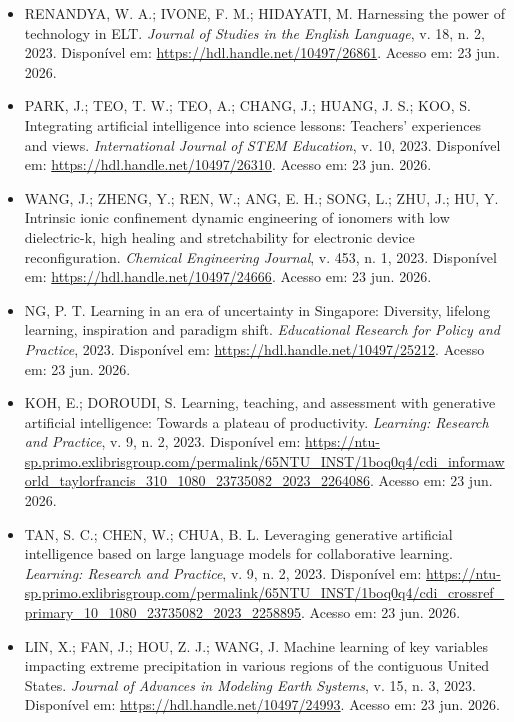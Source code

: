 \documentclass[english]{textolivre}
\begin{document}
\begin{itemize}
\item[] RENANDYA, W. A.; IVONE, F. M.; HIDAYATI, M. Harnessing the power of technology in ELT. \textit{Journal of Studies in the English Language}, v. 18, n. 2, 2023. Disponível em: \url{https://hdl.handle.net/10497/26861}. Acesso em: 23 jun. 2026.

\item[] PARK, J.; TEO, T. W.; TEO, A.; CHANG, J.; HUANG, J. S.; KOO, S. Integrating artificial intelligence into science lessons: Teachers’ experiences and views. \textit{International Journal of STEM Education}, v. 10, 2023. Disponível em: \url{https://hdl.handle.net/10497/26310}. Acesso em: 23 jun. 2026.

\item[] WANG, J.; ZHENG, Y.; REN, W.; ANG, E. H.; SONG, L.; ZHU, J.; HU, Y. Intrinsic ionic confinement dynamic engineering of ionomers with low dielectric-k, high healing and stretchability for electronic device reconfiguration. \textit{Chemical Engineering Journal}, v. 453, n. 1, 2023. Disponível em: \url{https://hdl.handle.net/10497/24666}. Acesso em: 23 jun. 2026.

\item[] NG, P. T. Learning in an era of uncertainty in Singapore: Diversity, lifelong learning, inspiration and paradigm shift. \textit{Educational Research for Policy and Practice}, 2023. Disponível em: \url{https://hdl.handle.net/10497/25212}. Acesso em: 23 jun. 2026.

\item[] KOH, E.; DOROUDI, S. Learning, teaching, and assessment with generative artificial intelligence: Towards a plateau of productivity. \textit{Learning: Research and Practice}, v. 9, n. 2, 2023. Disponível em: \url{https://ntu-sp.primo.exlibrisgroup.com/permalink/65NTU_INST/1boq0q4/cdi_informaworld_taylorfrancis_310_1080_23735082_2023_2264086}. Acesso em: 23 jun. 2026.

\item[] TAN, S. C.; CHEN, W.; CHUA, B. L. Leveraging generative artificial intelligence based on large language models for collaborative learning. \textit{Learning: Research and Practice}, v. 9, n. 2, 2023. Disponível em: \url{https://ntu-sp.primo.exlibrisgroup.com/permalink/65NTU_INST/1boq0q4/cdi_crossref_primary_10_1080_23735082_2023_2258895}. Acesso em: 23 jun. 2026.

\item[] LIN, X.; FAN, J.; HOU, Z. J.; WANG, J. Machine learning of key variables impacting extreme precipitation in various regions of the contiguous United States. \textit{Journal of Advances in Modeling Earth Systems}, v. 15, n. 3, 2023. Disponível em: \url{https://hdl.handle.net/10497/24993}. Acesso em: 23 jun. 2026.


\end{itemize}
\end{document}
